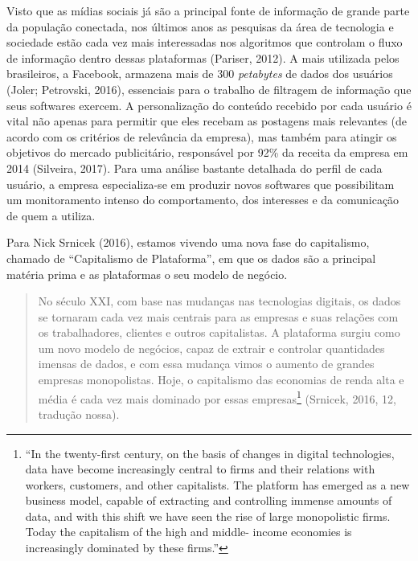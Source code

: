 Visto que as mídias sociais já são a principal fonte de informação de
grande parte da população conectada, nos últimos anos as pesquisas da
área de tecnologia e sociedade estão cada vez mais interessadas nos
algoritmos que controlam o fluxo de informação dentro dessas plataformas
(Pariser, 2012). A mais utilizada pelos brasileiros, a Facebook,
armazena mais de 300 \emph{petabytes} de dados dos usuários
\protect\hypertarget{__Fieldmark__1079_1356454502}{}{}(Joler; Petrovski,
2016)\protect\hypertarget{__Fieldmark__142_193002426}{}{\protect\hypertarget{__Fieldmark__108_1743353457}{}{}},
essenciais para o trabalho de filtragem de informação que seus softwares
exercem. A personalização do conteúdo recebido por cada usuário é vital
não apenas para permitir que eles recebam as postagens mais relevantes
(de acordo com os critérios de relevância da empresa), mas também para
atingir os objetivos do mercado publicitário, responsável por 92\% da
receita da empresa em 2014 (Silveira, 2017). Para uma análise bastante
detalhada do perfil de cada usuário, a empresa especializa-se em
produzir novos softwares que possibilitam um monitoramento intenso do
comportamento, dos interesses e da comunicação de quem a utiliza.

Para Nick Srnicek (2016), estamos vivendo uma nova fase do capitalismo,
chamado de ``Capitalismo de Plataforma'', em que os dados são a
principal matéria prima e as plataformas o seu modelo de negócio.

\begin{quote}
No século XXI, com base nas mudanças nas tecnologias digitais, os dados
se tornaram cada vez mais centrais para as empresas e suas relações com
os trabalhadores, clientes e outros capitalistas. A plataforma surgiu
como um novo modelo de negócios, capaz de extrair e controlar
quantidades imensas de dados, e com essa mudança vimos o aumento de
grandes empresas monopolistas. Hoje, o capitalismo das economias de
renda alta e média é cada vez mais dominado por essas empresas\footnote{``In
  the twenty-first century, on the basis of changes in digital
  technologies, data have become increasingly central to firms and their
  relations with workers, customers, and other capitalists. The platform
  has emerged as a new business model, capable of extracting and
  controlling immense amounts of data, and with this shift we have seen
  the rise of large monopolistic firms. Today the capitalism of the high
  and middle- income economies is increasingly dominated by these
  firms.''} (Srnicek, 2016, 12, tradução nossa).
\end{quote}

